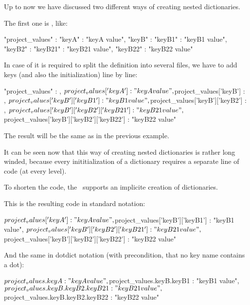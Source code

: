 Up to now we have discussed two different ways of creating nested dictionaries.

The first one is , like:

\begin{pythoncode}
{
   "project_values" : {"keyA" : "keyA value",
                       "keyB" : {"keyB1" : "keyB1 value",
                                 "keyB2" : {"keyB21" : "keyB21 value",
                                            "keyB22" : "keyB22 value"}}}
}
\end{pythoncode}

In case of it is required to split the definition into several files, we have to add keys (and also the initialization) line by line:

\begin{pythoncode}
{
   "project_values" : {},
   ${project_values}['keyA'] : "keyA value",
   ${project_values}['keyB'] : {},
   ${project_values}['keyB']['keyB1'] : "keyB1 value",
   ${project_values}['keyB']['keyB2'] : {},
   ${project_values}['keyB']['keyB2']['keyB21'] : "keyB21 value",
   ${project_values}['keyB']['keyB2']['keyB22'] : "keyB22 value"
}
\end{pythoncode}

The result will be the same as in the previous example.

It can be seen now that this way of creating nested dictionaries is rather long winded, because every inititialization of a dictionary
requires a separate line of code (at every level).

To shorten the code, the \pkg\ supports an implicite creation of dictionaries.

This is the resulting code in standard notation:

\begin{pythoncode}
{
   ${project_values}['keyA'] : "keyA value",
   ${project_values}['keyB']['keyB1'] : "keyB1 value",
   ${project_values}['keyB']['keyB2']['keyB21'] : "keyB21 value",
   ${project_values}['keyB']['keyB2']['keyB22'] : "keyB22 value"
}
\end{pythoncode}

\vspace{2ex}

And the same in dotdict notation (with precondition, that no key name contains a dot):

\begin{pythoncode}
{
   ${project_values.keyA} : "keyA value",
   ${project_values.keyB.keyB1} : "keyB1 value",
   ${project_values.keyB.keyB2.keyB21} : "keyB21 value",
   ${project_values.keyB.keyB2.keyB22} : "keyB22 value"
}
\end{pythoncode}

